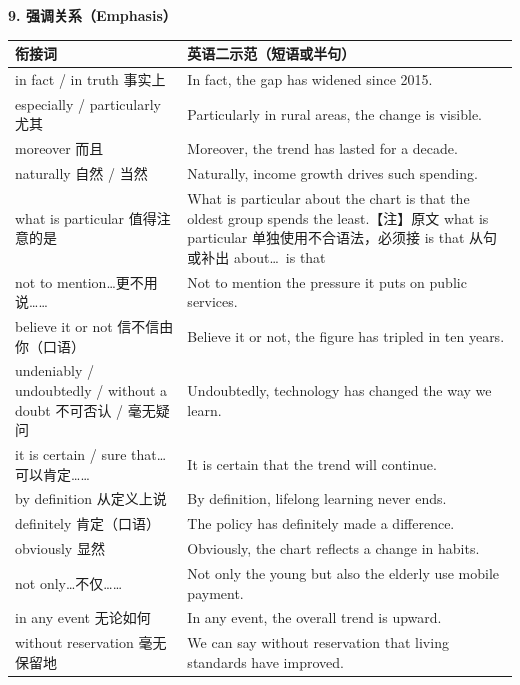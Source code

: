 \documentclass[11pt,a4paper]{ctexart}
\begin{document}
\par\addvspace{6pt}\noindent\textbf{9. 强调关系（Emphasis）}\par\addvspace{2pt}
\begin{longtable}{L{5.4cm}L{10.6cm}}
\toprule
\textbf{衔接词} & \textbf{英语二示范（短语或半句）} \\
\midrule
\endhead
in fact / in truth 事实上 & In fact, the gap has widened since 2015. \\
especially / particularly 尤其 & Particularly in rural areas, the change is visible. \\
moreover 而且 & Moreover, the trend has lasted for a decade. \\
naturally 自然 / 当然 & Naturally, income growth drives such spending. \\
what is particular 值得注意的是 & What is particular about the chart is that the oldest group spends the least.【注】原文 what is particular 单独使用不合语法，必须接 is that 从句或补出 about\ldots\ is that \\
not to mention\ldots 更不用说…… & Not to mention the pressure it puts on public services. \\
believe it or not 信不信由你（口语） & Believe it or not, the figure has tripled in ten years. \\
undeniably / undoubtedly / without a doubt 不可否认 / 毫无疑问 & Undoubtedly, technology has changed the way we learn. \\
it is certain / sure that\ldots 可以肯定…… & It is certain that the trend will continue. \\
by definition 从定义上说 & By definition, lifelong learning never ends. \\
definitely 肯定（口语） & The policy has definitely made a difference. \\
obviously 显然 & Obviously, the chart reflects a change in habits. \\
not only\ldots 不仅…… & Not only the young but also the elderly use mobile payment. \\
in any event 无论如何 & In any event, the overall trend is upward. \\
without reservation 毫无保留地 & We can say without reservation that living standards have improved. \\
\bottomrule
\end{longtable}
\end{document}
